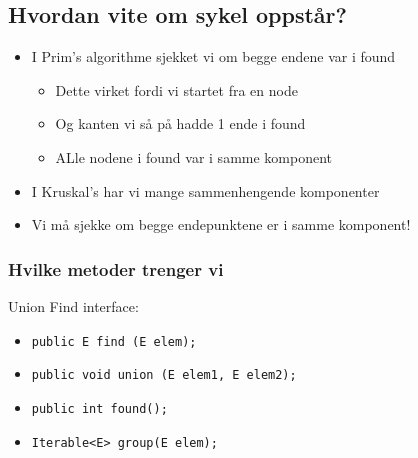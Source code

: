 \documentclass{article}
\begin{document}
    \subsection{Hvordan vite om sykel oppstår?}
    \begin{itemize}
        \item I Prim's algorithme sjekket vi om begge endene var i found
            \begin{itemize}
                \item Dette virket fordi vi startet fra en node
                \item Og kanten vi så på hadde 1 ende i found
                \item ALle nodene i found var i samme komponent
            \end{itemize}
        \item I Kruskal's har vi mange sammenhengende komponenter
        \item Vi må sjekke om begge endepunktene er i samme komponent!
    \end{itemize}

    \subsubsection{Hvilke metoder trenger vi}

    Union Find interface:
    \begin{itemize}
        \item \texttt{public E find (E elem);}
        \item \texttt{public void union (E elem1, E elem2);}
        \item \texttt{public int found();}
        \item \texttt{Iterable<E> group(E elem);}
    \end{itemize}
\end{document}
